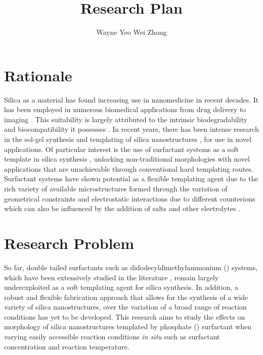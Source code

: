 \documentclass[a4paper,12pt]{article}
\date{}
\author{Wayne Yeo Wei Zhong} %
\title{Research Plan} %
\begin{document}
	\maketitle
	
	\section*{Rationale}
	Silica as a material has found increasing use in nanomedicine in recent decades. It has been employed in numerous biomedical applications from drug delivery \cite{slowing2008} to imaging \cite{ow2005}. This suitability is largely attributed to the intrinsic biodegradability and biocompatibility it possesses \cite{popplewell1998}. In recent years, there has been intense research in the sol-gel synthesis \cite{stober1968,yang2008,pohaku2012} and templating of silica nanostructures \cite{kresge1992,tomczak2005,bellomo2006,liu2013}, for use in novel applications. Of particular interest is the use of surfactant systems as a soft template in silica synthesis \cite{kresge1992,colfen2007} , unlocking non-traditional morphologies with novel applications that are unachievable through conventional hard templating routes. Surfactant systems have shown potential as a flexible templating agent due to the rich variety of available microstructures formed through the variation of geometrical constraints \cite{israelachvili1976} and electrostatic interactions due to different counterions \cite{kang1993} which can also be influenced by the addition of salts and other electrolytes \cite{thalberg1991}.
	
	\section*{Research Problem}
	So far, double tailed surfactants such as didodecyldimethylammonium () systems, which have been extensively studied in the literature \cite{warr1988,liu2014}, remain largely underexploited as a soft templating agent for silica synthesis. In addition, a robust and flexible fabrication approach that allows for the synthesis of a wide variety of silica nanostructures, over the variation of a broad range of reaction conditions has yet to be developed. This research aims to study the effects on morphology of silica nanostructures templated by  phosphate () surfactant when varying easily accessible reaction conditions \textit{in situ} such as surfactant concentration and reaction temperature.	 
	
\end{document}
